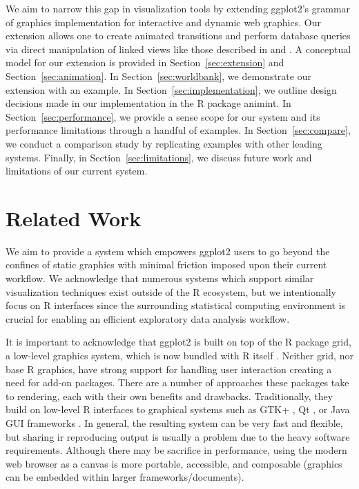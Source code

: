\documentclass[journal]{vgtc}\usepackage[]{graphicx}\usepackage[]{color}
\begin{document}
We aim to narrow this gap in visualization tools by extending ggplot2's grammar 
of graphics implementation for interactive and dynamic web graphics. Our 
extension allows one to create animated transitions
and perform database queries via direct manipulation of linked views like those
described in \citep{Ahlberg:1991} and \citep{Buja:1991vh}. 
A conceptual model for our extension is provided in
Section~\ref{sec:extension} and Section~\ref{sec:animation}. In 
Section~\ref{sec:worldbank}, we demonstrate our extension with an example. 
In Section~\ref{sec:implementation}, we outline design decisions made in our
implementation in the R package animint. In Section~\ref{sec:performance}, we
provide a sense scope for our system and its performance limitations through a
handful of examples. In Section~\ref{sec:compare}, we conduct a comparison
study by replicating examples with other leading systems. Finally, in 
Section~\ref{sec:limitations}, we discuss future work and limitations of
our current system.

\section{Related Work}

We aim to provide a system which empowers ggplot2 users to go beyond the 
confines of static graphics with minimal friction imposed upon their current
workflow. We acknowledge that numerous systems which support similar 
visualization techniques exist outside of the R ecosystem, but we 
intentionally focus on R interfaces since the surrounding statistical 
computing environment is crucial for enabling an efficient exploratory data 
analysis workflow.

It is important to acknowledge that ggplot2 is built on top of the R package 
grid, a low-level graphics system, which is now bundled with R itself 
\citep{RCore}. Neither grid, nor base R graphics, have strong support for 
handling user interaction creating a need for add-on packages. There are a 
number of approaches these packages take to rendering, each with their own 
benefits and drawbacks. Traditionally, they build on low-level R interfaces 
to graphical systems such as GTK+ \citep{RGtk2}, Qt \citep{qtbase, qtpaint}, 
or Java GUI frameworks \citep{rJava}. In general, the resulting system can be 
very fast and flexible, but sharing ir reproducing output is usually a problem 
due to the heavy software requirements. Although there may be sacrifice in
performance, using the modern web browser as a canvas is more portable, 
accessible, and composable (graphics can be embedded within larger 
frameworks/documents).
\end{document}
